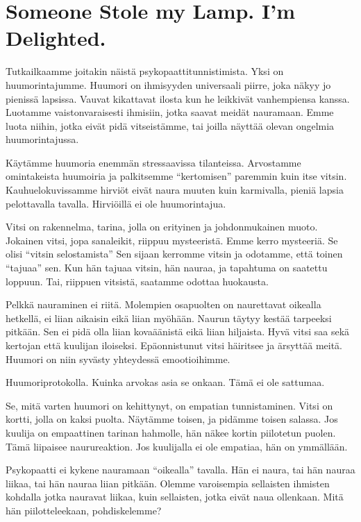 \section{Someone Stole my Lamp. I'm Delighted.}

Tutkailkaamme joitakin näistä psykopaattitunnistimista. Yksi on huumorintajumme. Huumori on ihmisyyden universaali piirre, joka näkyy jo pienissä lapsissa. Vauvat kikattavat ilosta kun he leikkivät vanhempiensa kanssa. Luotamme vaistonvaraisesti ihmisiin, jotka saavat meidät nauramaan. Emme luota niihin, jotka eivät pidä vitseistämme, tai joilla näyttää olevan ongelmia huumorintajussa.

Käytämme huumoria enemmän stressaavissa tilanteissa. Arvostamme omintakeista huumoiria ja palkitsemme ``kertomisen'' paremmin kuin itse vitsin. Kauhuelokuvissamme hirviöt eivät naura muuten kuin karmivalla, pieniä lapsia pelottavalla tavalla. Hirviöillä ei ole huumorintajua.

Vitsi on rakennelma, tarina, jolla on erityinen ja johdonmukainen muoto. Jokainen vitsi, jopa sanaleikit, riippuu mysteeristä. Emme kerro mysteeriä. Se olisi ``vitsin selostamista'' Sen sijaan kerromme vitsin ja odotamme, että toinen ``tajuaa'' sen. Kun hän tajuaa vitsin, hän nauraa, ja tapahtuma on saatettu loppuun. Tai, riippuen vitsistä, saatamme odottaa huokausta.

Pelkkä nauraminen ei riitä. Molempien osapuolten on naurettavat oikealla hetkellä, ei liian aikaisin eikä liian myöhään. Naurun täytyy kestää tarpeeksi pitkään. Sen ei pidä olla liian kovaäänistä eikä liian hiljaista. Hyvä vitsi saa sekä kertojan että kuulijan iloiseksi. Epäonnistunut vitsi häiritsee ja ärsyttää meitä. Huumori on niin syvästy yhteydessä emootioihimme.

Huumoriprotokolla. Kuinka arvokas asia se onkaan. Tämä ei ole sattumaa.

Se, mitä varten huumori on kehittynyt, on empatian tunnistaminen. Vitsi on kortti, jolla on kaksi puolta. Näytämme toisen, ja pidämme toisen salassa. Jos kuulija on empaattinen tarinan hahmolle, hän näkee kortin piilotetun puolen. Tämä liipaisee naurureaktion. Jos kuulijalla ei ole empatiaa, hän on ymmällään.

Psykopaatti ei kykene nauramaan ``oikealla'' tavalla. Hän ei naura, tai hän nauraa liikaa, tai hän nauraa liian pitkään. Olemme varoisempia sellaisten ihmisten kohdalla jotka nauravat liikaa, kuin sellaisten, jotka eivät naua ollenkaan. Mitä hän piilotteleekaan, pohdiskelemme?


